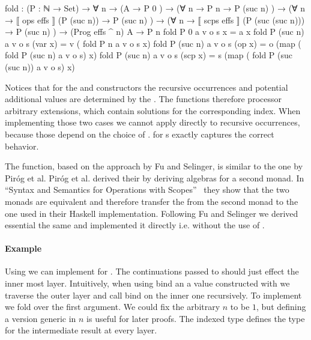 \begin{code}
fold : (P : ℕ → Set) → ∀ n →
  (A                                           → P 0        )  →
  (∀ {n} → P n                                 → P (suc n)  )  →
  (∀ {n} → ⟦ ops   effs  ⟧  (P (suc n))        → P (suc n)  )  →
  (∀ {n} → ⟦ scps  effs  ⟧  (P (suc (suc n)))  → P (suc n)  )  →
  (Prog effs ^ n) A → P n
fold P 0        a v o s x         = a  x
fold P (suc n)  a v o s (var  x)  = v  (       fold P n              a v o s   x)
fold P (suc n)  a v o s (op   x)  = o  (map (  fold P (suc n)        a v o s)  x)
fold P (suc n)  a v o s (scp  x)  = s  (map (  fold P (suc (suc n))  a v o s)  x)
\end{code}
Notices that for the  and
 constructors the recursive occurrences and
potential additional values are determined by the .
The functions therefore processor arbitrary  extensions,
which contain solutions for the corresponding index.
When implementing those two cases we cannot apply  directly
to recursive occurrences, because those depend on the choice of
.
 for s exactly captures the correct
behavior.

The  function, based on the approach by Fu and Selinger, is
similar to the one by Piróg et al.
Piróg et al. derived their  by deriving algebras for a
second monad.
In ``Syntax and Semantics for Operations with
Scopes''~\cite{DBLP:conf/lics/PirogSWJ18} they show that the two monads are
equivalent and therefore transfer the  from the
second monad to the one used in their Haskell implementation.
Following Fu and Selinger we derived essential the same 
and implemented it directly i.e. without the use of \AgdaFunction{>>=}.

\paragraph{Example}
Using  we can implement \AgdaFunction{>>=} for
\AgdaSpace{}\AgdaSpace{}.
The continuations  passed to \AgdaFunction{>>=} should just
effect the inner most layer.
Intuitively, when using bind an a value constructed with
 we traverse the outer layer and call bind on the
inner one recursively.
To implement \AgdaFunction{>>=} we fold over the first argument.
We could fix the arbitrary $n$ to be $1$, but defining a version generic in $n$
is useful for later proofs.
The  indexed type  defines the type for the
intermediate result at every layer.

